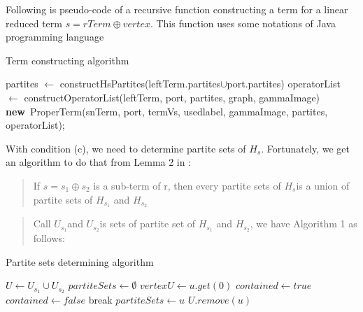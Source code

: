 \documentclass[a4paper, 12pt]{article}
\begin{document}
Following is pseudo-code of a recursive function constructing a term for a linear reduced term {$s=rTerm\oplus vertex$}. This function uses some notations of Java programming language

\begin{algorithm}
\caption{Term constructing algorithm}
\begin{algorithmic}[1]
	\Else
	\EndIf
	\State partites {$\gets$} constructHsPartites(leftTerm.partites{$\cup$}port.partites)
	\State operatorList {$\gets$} constructOperatorList(leftTerm, port,
                partites, graph, gammaImage)\linebreak
	\State \Return \textbf{new}\ ProperTerm(snTerm, port, termVs, usedlabel,
                gammaImage, partites, operatorList);
\EndFunction
\end{algorithmic}

\end{algorithm}

With condition (c), we need to determine partite sets of \textit {$H_{s}$}. Fortunately, we get an algorithm to do that from Lemma 2 in \cite {vadim-lozin} : 

\begin{quotation}
If $s=s_{1}\oplus s_{2}$ is a sub-term of r, then every partite sets of \textit {$H_{s}$}is a union of partite sets of $H_{s_{1}}$ and $H_{s_{2}}$ 
\end{quotation}

\begin{quotation}
Call $U_{s_{1}}$and $U_{s_{2}}$is sets of partite set of $H_{s_{1}}$ and $H_{s_{2}}$, we have Algorithm 1 as follows:
\end{quotation}

\begin{algorithm}[H]
\caption{Partite sets determining algorithm}
\begin{algorithmic}[1]
	\State $U\gets U_{s_{1}} \cup U_{s_{2}}$ 
		\State $partiteSets\leftarrow\emptyset$
			\State $vertexU\gets u.get(0)$
				\State $contained\gets true$
					\State $contained\gets false$
					\State break
				\EndIf
			\EndFor
				\State $partiteSets\gets u$
				\State $U.remove(u)$
			\EndIf
		\EndFor
	\EndWhile 
\end{algorithmic}
\end{algorithm}
\end{document}
